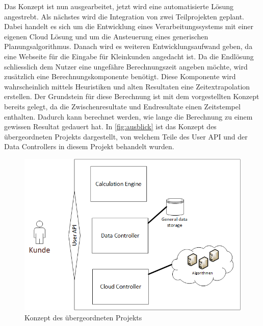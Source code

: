 Das Konzept ist nun ausgearbeitet, jetzt wird eine automatisierte Lösung angestrebt. Als nächstes wird die Integration von zwei Teilprojekten geplant. Dabei handelt es sich um die Entwicklung eines 
Verarbeitungssystems mit einer eigenen Cloud Lösung und um die Ansteuerung eines generischen Planungsalgorithmus. Danach wird es weiteren Entwicklungsaufwand geben, da eine 
Webseite für die Eingabe für Kleinkunden angedacht ist. Da die Endlösung schliesslich dem Nutzer eine ungefähre Berechnungszeit angeben möchte, wird zusätzlich eine Berechnungskomponente 
benötigt. Diese Komponente wird wahrscheinlich mittels Heuristiken und alten Resultaten eine Zeitextrapolation erstellen. Der Grundstein für diese Berechnung ist mit dem vorgestellten Konzept 
bereits gelegt, da die Zwischenresultate und Endresultate einen Zeitstempel enthalten. Dadurch kann berechnet werden, wie lange die Berechnung zu einem gewissen Resultat gedauert hat. In 
\autoref{fig:ausblick} ist das Konzept des übergeordneten Projekts dargestellt, von welchem Teile des User API und der Data Controllers in diesem Projekt behandelt wurden.

\begin{figure}[h]
\centering
\includegraphics[scale=0.8]{images/visio/ausblick.png}
\caption[Konzept des übergeordneten Projekts]{Konzept des übergeordneten Projekts \selfmade{}}
\label{fig:ausblick}
\end{figure}